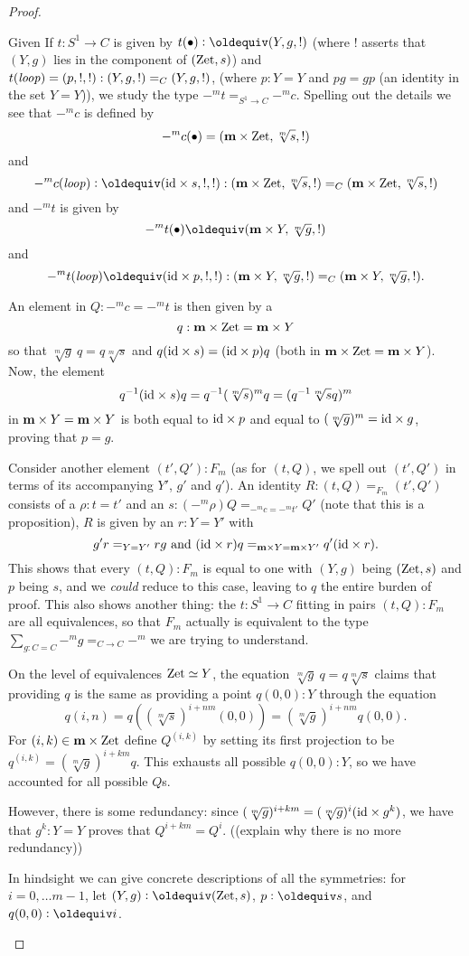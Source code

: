 \begin{proof}
\begin{enumerate}
Given If $t:S^1\to C$ is given by $t(\base)\defequi (Y,g,!)$ (where $!$ asserts that $(Y,g)$ lies in the component of $(\mathrm{Zet},s)$)  and $t(\mathit{loop})=(p,!,!):(Y,g,!)=_C(Y,g,!)$, (where $p:Y=Y$ and $pg=gp$ (an identity in the set $Y=Y$)), we study the type $-^mt=_{S^1\to C}-^mc$.
Spelling out the details we see that $-^mc$ is defined by 
$$-^mc(\bullet)=(\mathbf{m}\times\mathrm{Zet},\sqrt[m]s,!)$$ and 
$$-^mc(\Sloop)\defequi(\id\times s,!,!):(\bn m\times\zet,\sqrt[m]s,!)=_C(\bn m\times\zet,\sqrt[m]s,!)$$   and $-^mt$ is given by $$-^mt(\base)\oldequiv(\bn m\times Y,\sqrt[m]g,!)$$ and 
$$-^mt(\Sloop)\oldequiv(\id\times p,!,!):(\bn m\times Y,\sqrt[m]g,!)=_C(\bn m\times Y,\sqrt[m]g,!).$$

An element in $Q:-^mc=-^mt$ is then given by a 
$$q:\mathbf{m}\times\mathrm{Zet}=\mathbf{m}\times Y$$ so that $\sqrt[m]g\ q=q\sqrt[m]s$ and $q(\mathord{\mathrm{id}}\times s)=(\mathord{\mathrm{id}}\times p)q$ (both in $\mathbf{m}\times\mathrm{Zet}=\mathbf{m}\times Y$). 
Now, the element $$q^{-1}(\mathord{\mathrm{id}}\times s)q=q^{-1}(\sqrt[m]s)^mq=(q^{-1}\sqrt[m]sq)^m$$ in $\mathbf{m}\times Y=\mathbf{m}\times Y$ is both equal to $\mathord{\mathrm{id}}\times p$ and equal to $(\sqrt[m]g)^m=\mathord{\mathrm{id}}\times g$, proving that $p=g$. 


Consider another element $(t',Q'):F_m$ (as for $(t,Q)$, we spell out $(t',Q')$ in terms of its accompanying $Y'$, $g'$ and $q'$). 
An identity  $R:(t,Q)=_{F_m}(t',Q')$ consists of a $\rho:t=t'$ and an $s:(-^m\rho)Q=_{-^mc=-^mt'}Q'$ (note that this is a proposition), \ie $R$ is given by an $r:Y=Y'$ with 
$$g'r=_{Y=Y'}rg\text{ and }(\mathord{\mathrm{id}}\times r)q=_{\mathbf{m}\times Y=\mathbf{m}\times Y'}q'(\mathord{\mathrm{id}}\times r).$$  This shows that every $(t,Q):F_m$ is equal to one with $(Y,g)$ being $(\mathrm{Zet},s)$ and $p$ being $s$, and we \emph{could} reduce to this case, leaving to $q$ the entire burden of proof.  
This also shows another thing: the $t:S^1\to C$ fitting in pairs $(t,Q):F_m$ are all equivalences, so that $F_m$ actually is equivalent to the type $\sum_{g:C=C}-^mg=_{C\to C}-^m$ we are trying to understand.

 On the level of equivalences $\mathrm{Zet}\simeq Y$, the equation  $\sqrt[m]g\ q=q\sqrt[m]s$ claims that providing $q$ is the same as providing a point $q(0,0):Y$ through the equation  
$$q(i,n)=q((\sqrt[m]s)^{i+nm}(0,0))=(\sqrt[m]g)^{i+nm}q(0,0).$$  For $(i,k)\in \mathbf{m}\times\mathrm{Zet}$ define $Q^{(i,k)}$ by setting its first projection to be $q^{(i,k)}=(\sqrt[m]g)^{i+km}q$.  
This exhausts all possible $q(0,0):Y$, so we have accounted for all possible $Q$s.

However, there is some redundancy: since $(\sqrt[m]g)^{i+km}=(\sqrt[m]g)^i(\mathord{\mathrm{id}}\times g^k)$, we have that $g^k:Y=Y$ proves that $Q^{i+km}=Q^{i}$.  ((explain why there is no more redundancy)) 

In hindsight we can give concrete descriptions of all the symmetries: for $i=0,\dots m-1$, let $(Y,g)\defequi (\zet,s)$, $p\defequi s$, and $q(0,0)\defequi i$.
    \end{enumerate}
  \end{proof}

